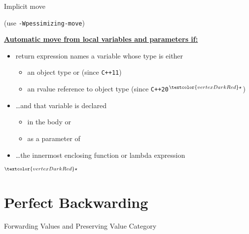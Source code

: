 \begin{frame}{Implicit move}
    \begin{center}

        (use \texttt{-Wpessimizing-move})
    \end{center}

    \href{https://en.cppreference.com/w/cpp/language/return}{\textbf{Automatic move from local variables and parameters \underline{if}:}}
    \begin{itemize}
        \item return expression names a variable whose type is either
        \begin{itemize}
            \item an object type or (since \texttt{C++11})
            \item an rvalue reference to object type (since \texttt{C++20}${}^{\textcolor{vertexDarkRed}\star}$)
        \end{itemize}
        \item \ldots and that variable is declared
        \begin{itemize}
            \item in the body or
            \item as a parameter of
        \end{itemize}
        \item \ldots the innermost enclosing function or lambda expression
    \end{itemize}

    ${}^{\textcolor{vertexDarkRed}\star}$ 
\end{frame}

\begin{frame}
    \centering
    \scalebox{3}{Perfect Backwarding}
\end{frame}

\section{Perfect Backwarding}

\begin{frame}[fragile]{Forwarding Values and Preserving Value Category}
    \centering


\end{frame}

